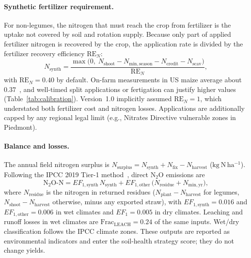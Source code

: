 \paragraph{Synthetic fertilizer requirement.} For non-legumes, the nitrogen that must reach the crop from fertilizer is the uptake not covered by soil and rotation supply. Because only part of applied fertilizer nitrogen is recovered by the crop, the application rate is divided by the fertilizer recovery efficiency $\mathrm{RE}_N$:
\begin{equation}
  N_{\mathrm{synth}} = \frac{\max\!\bigl(0,\; N_{\mathrm{shoot}} - N_{\mathrm{min,season}} - N_{\mathrm{credit}} - N_{\mathrm{scav}}\bigr)}{\mathrm{RE}_N},
\end{equation}
with $\mathrm{RE}_N = 0.40$ by default. On-farm measurements in US maize average about $0.37$~\cite{cassman2002agroecosystems}, and well-timed split applications or fertigation can justify higher values (Table~\ref{tab:calibration}). Version~1.0 implicitly assumed $\mathrm{RE}_N = 1$, which understated both fertilizer cost and nitrogen losses. Applications are additionally capped by any regional legal limit (e.g., Nitrates Directive vulnerable zones in Piedmont).

\paragraph{Balance and losses.} The annual field nitrogen surplus is $N_{\mathrm{surplus}} = N_{\mathrm{synth}} + N_{\mathrm{fix}} - N_{\mathrm{harvest}}$ ($\mathrm{kg~N\,ha^{-1}}$). Following the IPCC 2019 Tier-1 method~\cite{ipcc2019n2o}, direct N$_2$O emissions are
\begin{equation}
  \mathrm{N_2O\text{-}N} = EF_{1,\mathrm{synth}}\, N_{\mathrm{synth}} + EF_{1,\mathrm{other}}\,\bigl(N_{\mathrm{residue}} + N_{\mathrm{min,yr}}\bigr),
\end{equation}
where $N_{\mathrm{residue}}$ is the nitrogen in returned residues ($N_{\mathrm{plant}} - N_{\mathrm{harvest}}$ for legumes, $N_{\mathrm{shoot}} - N_{\mathrm{harvest}}$ otherwise, minus any exported straw), with $EF_{1,\mathrm{synth}} = 0.016$ and $EF_{1,\mathrm{other}} = 0.006$ in wet climates and $EF_1 = 0.005$ in dry climates. Leaching and runoff losses in wet climates are $\mathrm{Frac_{LEACH}} = 0.24$ of the same inputs. Wet/dry classification follows the IPCC climate zones. These outputs are reported as environmental indicators and enter the soil-health strategy score; they do not change yields.

